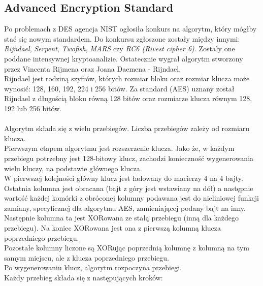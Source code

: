 \subsection{Advanced Encryption Standard}
Po problemach z DES agencja NIST ogłosiła konkurs na algorytm, który mógłby stać się nowym standardem.
Do konkursu zgłoszone zostały między innymi: \textit{Rijndael}, \textit{Serpent}, \textit{Twofish}, \textit{MARS} czy \textit{RC6 (Rivest cipher 6)}. 
Zostały one poddane intensywnej kryptoanalizie. 
Ostatecznie wygrał algorytm stworzony przez Vincenta Rijmena oraz Joana Daemena - Rijndael. \\
Rijndael jest rodziną szyfrów, których rozmiar bloku oraz rozmiar klucza może wynosić: 128, 160, 192, 224 i 256 bitów. 
Za standard (AES) uznany został Rijndael z długością bloku równą 128 bitów oraz rozmiarze klucza równym 128, 192 lub 256 bitów. \\ \\
Algorytm składa się z wielu przebiegów. Liczba przebiegów zależy od rozmiaru klucza. \\
Pierwszym etapem algorytmu jest rozszerzenie klucza. 
Jako że, w każdym przebiegu potrzebny jest 128-bitowy klucz, zachodzi konieczność wygenerowania wielu kluczy, 
na podstawie głównego klucza. \\
W pierwszej kolejności główny klucz jest ładowany do macierzy 4 na 4 bajty. 
Ostatnia kolumna jest obracana (bajt z góry jest wstawiany na dół) a następnie 
wartość każdej komórki z obróconej kolumny podawana jest do nieliniowej funkcji zamiany, 
specyficznej dla algorytmu AES, zamieniającej podany bajt na inny.
Następnie kolumna ta jest XORowana ze stałą przebiegu (inną dla każdego przebiegu). 
Na koniec XORowana jest ona z pierwszą kolumną klucza poprzedniego przebiegu. \\
Pozostałe kolumny liczone są XORując poprzednią kolumnę z kolumną na tym samym miejscu, ale z klucza poprzedniego przebiegu. \\ 
Po wygenerowaniu klucz, algorytm rozpoczyna przebiegi. \\
Każdy przebieg składa się z następujących kroków:
